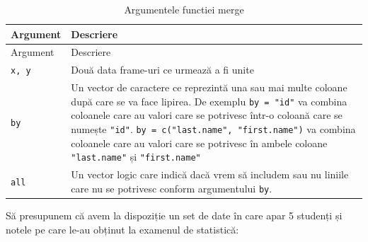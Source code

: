 \documentclass[]{article}
\begin{document}
\begin{longtable}[]{@{}ll@{}}
\caption{Argumentele functiei merge}\tabularnewline
\toprule
\begin{minipage}[b]{0.18\columnwidth}\raggedright\strut
Argument\strut
\end{minipage} & \begin{minipage}[b]{0.67\columnwidth}\raggedright\strut
Descriere\strut
\end{minipage}\tabularnewline
\midrule
\endfirsthead
\toprule
\begin{minipage}[b]{0.18\columnwidth}\raggedright\strut
Argument\strut
\end{minipage} & \begin{minipage}[b]{0.67\columnwidth}\raggedright\strut
Descriere\strut
\end{minipage}\tabularnewline
\midrule
\endhead
\begin{minipage}[t]{0.18\columnwidth}\raggedright\strut
\texttt{x,\ y}\strut
\end{minipage} & \begin{minipage}[t]{0.67\columnwidth}\raggedright\strut
Două data frame-uri ce urmează a fi unite\strut
\end{minipage}\tabularnewline
\begin{minipage}[t]{0.18\columnwidth}\raggedright\strut
\texttt{by}\strut
\end{minipage} & \begin{minipage}[t]{0.67\columnwidth}\raggedright\strut
Un vector de caractere ce reprezintă una sau mai multe coloane după care
se va face lipirea. De exemplu \texttt{by\ =\ "id"} va combina coloanele
care au valori care se potrivesc într-o coloană care se numește
\texttt{"id"}. \texttt{by\ =\ c("last.name",\ "first.name")} va combina
coloanele care au valori care se potrivesc în ambele coloane
\texttt{"last.name"} și \texttt{"first.name"}\strut
\end{minipage}\tabularnewline
\begin{minipage}[t]{0.18\columnwidth}\raggedright\strut
\texttt{all}\strut
\end{minipage} & \begin{minipage}[t]{0.67\columnwidth}\raggedright\strut
Un vector logic care indică dacă vrem să includem sau nu liniile care nu
se potrivesc conform argumentului \texttt{by}.\strut
\end{minipage}\tabularnewline
\bottomrule
\end{longtable}

Să presupunem că avem la dispoziție un set de date în care apar 5
studenți și notele pe care le-au obținut la examenul de statistică:
\end{document}
